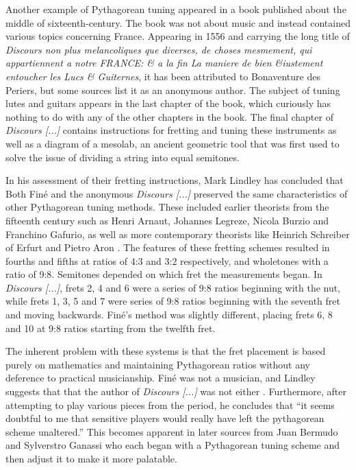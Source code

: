 Another example of Pythagorean tuning appeared in a book published about the middle of
sixteenth-century.  The book was not about music and instead contained various topics
concerning France.  Appearing in 1556 and carrying the long title of \textit{Discours non
plus melancoliques que diverses, de choses mesmement, qui appartiennent a notre FRANCE: \&
a la fin La maniere de bien \&iustement entoucher les Lucs \& Guiternes}, it has been
attributed to Bonaventure des Periers, but some sources list it as an anonymous author.
The subject of tuning lutes and guitars appears in the last chapter of the book, which
curiously has nothing to do with any of the other chapters in the book. The final chapter
of \textit{Discours [...]} contains instructions for fretting and tuning these instruments
as well as a diagram of a mesolab, an ancient geometric tool that was first used to solve
the issue of dividing a string into equal semitones.

In his assessment of their fretting instructions, Mark Lindley has concluded that Both
Fin\'{e} and the anonymous \textit{Discours [...]}  preserved the same characteristics of
other Pythagorean tuning methods.  These included earlier theorists from the fifteenth
century such as Henri Arnaut, Johannes Legreze, Nicola Burzio and Franchino Gafurio, as
well as more contemporary theorists like Heinrich Schreiber of Erfurt and Pietro Aron
\autocite[11]{ML:1}. The features of these fretting schemes resulted in fourths and fifths
at ratios of 4:3 and 3:2 respectively, and wholetones with a ratio of 9:8.  Semitones
depended on which fret the measurements began.  In \textit{Discours [...]}, frets 2, 4 and
6 were a series of 9:8 ratios beginning with the nut, while frets 1, 3, 5 and 7 were
series of 9:8 ratios beginning with the seventh fret and moving backwards.  Fin\'{e}'s
method was slightly different, placing frets 6, 8 and 10 at 9:8 ratios starting from the
twelfth fret.

The inherent problem with these systems is that the fret placement is based purely on
mathematics and maintaining Pythagorean ratios without any deference to practical
musicianship. Fin\'{e} was not a musician, and Lindley suggests that that the author of
\textit{Discours [...]} was not either \autocite[11]{ML:1}.  Furthermore, after
attempting to play various pieces from the period, he concludes that ``it seems
doubtful to me that sensitive players would really have left the pythagorean scheme
unaltered.'' \autocite[13]{ML:1}  This becomes apparent in later sources from Juan
Bermudo and Sylverstro Ganassi who each began with a Pythagorean tuning scheme and then
adjust it to make it more palatable.

